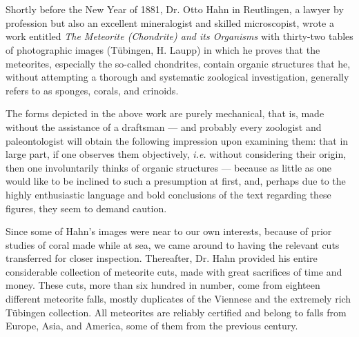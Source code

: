 \documentclass[a4paper, 12pt, oneside]{article}
\begin{document}
\section{}
\subsection*{}
\paragraph*{}
Shortly before the New Year of 1881, Dr. Otto Hahn in Reutlingen, a lawyer by profession but also an excellent mineralogist and skilled microscopist, wrote a work entitled \emph{The Meteorite (Chondrite) and its Organisms} with thirty-two tables of photographic images (Tübingen, H. Laupp) in which he proves that the meteorites, especially the so-called chondrites, contain organic structures that he, without attempting a thorough and systematic zoological investigation, generally refers to as sponges, corals, and crinoids.

The forms depicted in the above work are purely mechanical, that is, made without the assistance of a draftsman --- and probably every zoologist and paleontologist will obtain the following impression upon examining them: that in large part, if one observes them objectively, \emph{i.e.} without considering their origin, then one involuntarily thinks of organic structures --- because as little as one would like to be inclined to such a presumption at first, and, perhaps due to the highly enthusiastic language and bold conclusions of the text regarding these figures, they seem to demand caution.

Since some of Hahn's images were near to our own interests, because of prior studies of coral made while at sea, we came around to having the relevant cuts transferred for closer inspection. Thereafter, Dr. Hahn provided his entire considerable collection of meteorite cuts, made with great sacrifices of time and money. These cuts, more than six hundred in number, come from eighteen different meteorite falls, mostly duplicates of the Viennese and the extremely rich Tübingen collection. All meteorites are reliably certified and belong to falls from Europe, Asia, and America, some of them from the previous century.
\end{document}
